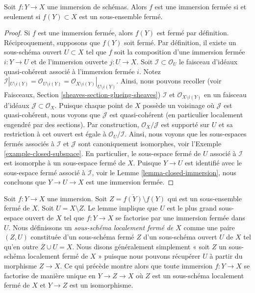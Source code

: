 \begin{lemma}
\label{lemma-immersion-when-closed}
Soit  $f : Y \to X$  une immersion de schémas. Alors  $f$  est une immersion
fermée si et seulement si  $f(Y) \subset X$  est un sous-ensemble fermé.
\end{lemma}

\begin{proof}
Si  $f$  est une immersion fermée, alors  $f(Y)$  est fermé par
définition. Réciproquement, supposons que  $f(Y)$  soit fermé. Par définition,
il existe un sous-schéma ouvert  $U \subset X$  tel que  $f$  soit la
composition d'une immersion fermée  $i : Y \to U$  et de l'immersion ouverte
 $j : U \to X$. Soit  $\mathcal{I} \subset \mathcal{O}_U$  le faisceau d'idéaux quasi-cohérent associé à
l'immersion fermée  $i$. Notez  $\mathcal{I}|_{U \setminus i(Y)}
= \mathcal{O}_{U \setminus i(Y)}
= \mathcal{O}_{X \setminus i(Y)}|_{U \setminus i(Y)}$. Ainsi, nous pouvons recoller
(voir Faisceaux, Section  \ref{sheaves-section-glueing-sheaves})  $\mathcal{I}$  et  $\mathcal{O}_{X \setminus i(Y)}$  en un faisceau
d'idéaux  $\mathcal{J} \subset \mathcal{O}_X$. Puisque chaque point de  $X$  possède un voisinage
où  $\mathcal{J}$  est quasi-cohérent, nous voyons que  $\mathcal{J}$  est
quasi-cohérent (en particulier localement engendré par des sections). Par
construction,  $\mathcal{O}_X/\mathcal{J}$  est supporté sur  $U$  et sa restriction à cet ouvert est égale à
 $\mathcal{O}_U/\mathcal{I}$. Ainsi, nous voyons que les sous-espaces fermés associés à
 $\mathcal{I}$  et  $\mathcal{J}$  sont canoniquement isomorphes, voir l'Exemple
 \ref{example-closed-subspace}. En particulier, le sous-espace fermé de  $U$  associé à
 $\mathcal{I}$  est isomorphe à un sous-espace fermé de  $X$. Puisque
 $Y \to U$  est identifié avec le sous-espace fermé associé à  $\mathcal{I}$, voir
le Lemme  \ref{lemma-closed-immersion}, nous concluons que  $Y \to U \to X$  est une immersion fermée.
\end{proof}

\noindent
Soit  $f : Y \to X$  une immersion. Soit  $Z = \overline{f(Y)} \setminus f(Y)$  qui est un sous-ensemble fermé
de  $X$. Soit  $U = X \setminus Z$. Le lemme implique que  $U$  est le plus
grand sous-espace ouvert de  $X$  tel que  $f : Y \to X$  se factorise par une
immersion fermée dans  $U$. Nous définissons un  {\it 
sous-schéma localement fermé de  $X$}  comme une paire  $(Z, U)$ 
constituée d'un sous-schéma fermé  $Z$  d'un sous-schéma ouvert
 $U$  de  $X$  tel qu'en outre  $\overline{Z} \cup U = X$. Nous disons
généralement simplement « soit  $Z$  un sous-schéma localement fermé de
 $X$ » puisque nous pouvons récupérer  $U$  à partir du morphisme
 $Z \to X$. Ce qui précède montre alors que toute immersion  $f : Y \to X$  se
factorise de manière unique en  $Y \to Z \to X$  où  $Z$  est un sous-schéma
localement fermé de  $X$  et  $Y \to Z$  est un isomorphisme.

